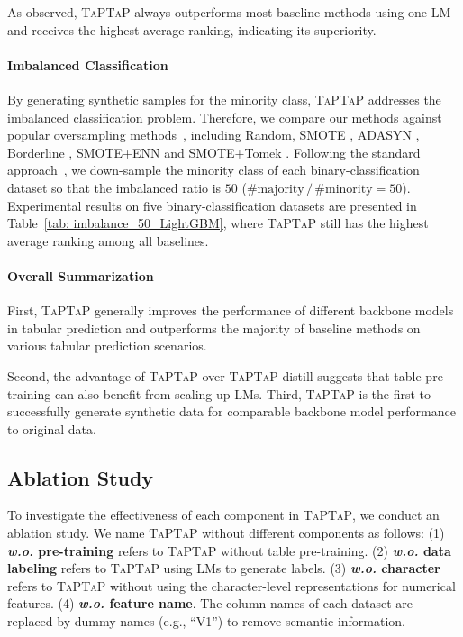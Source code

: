 As observed, \textsc{TaPTaP} always outperforms most baseline methods using one LM and receives the highest average ranking, indicating its superiority.

\paragraph{Imbalanced Classification}

By generating synthetic samples for the minority class, \textsc{TaPTaP} addresses the imbalanced classification problem. Therefore, we compare our methods against popular oversampling methods~\citep{oversampling}, including {Random}, {SMOTE} \citep{chawla2002smote}, {ADASYN} \citep{he2008adasyn}, {Borderline} \citep{han2005borderline}, {SMOTE+ENN} \citep{alejo2010edited} and {SMOTE+Tomek} \citep{zeng2016effective}. Following the standard approach~\citep{buda2018systematic}, we down-sample the minority class of each binary-classification dataset so that the imbalanced ratio is $50$ ($\text{\#majority}\,/\,{\text{\#minority}}\!\!=\!\!50$).
Experimental results on five binary-classification datasets are presented in Table~\ref{tab: imbalance_50_LightGBM}, where \textsc{TaPTaP} still has the highest average ranking among all baselines.

\paragraph{Overall Summarization}

First, \textsc{TaPTaP} generally improves the performance of different backbone models in tabular prediction and outperforms the majority of baseline methods on various tabular prediction scenarios. 

Second, the advantage of \textsc{TaPTaP} over \textsc{TaPTaP}-distill suggests that table pre-training can also benefit from scaling up LMs. Third, \textsc{TaPTaP} is the first to successfully generate synthetic data for comparable backbone model performance to original data.

\subsection{Ablation Study} \label{sec: analysis}

To investigate the effectiveness of each component in \textsc{TaPTaP}, we conduct an ablation study. We name \textsc{TaPTaP} without different components as follows: (1) \textbf{\textit{w.o.} pre-training} refers to \textsc{TaPTaP} without table pre-training. (2) \textbf{\textit{w.o.} data labeling} refers to \textsc{TaPTaP} using LMs to generate labels. (3) \textbf{\textit{w.o.} character} refers to \textsc{TaPTaP} without using the character-level representations for numerical features. (4) \textbf{\textit{w.o.} feature name}. The column names of each dataset are replaced by dummy names (e.g., ``V1'') to remove semantic information.

